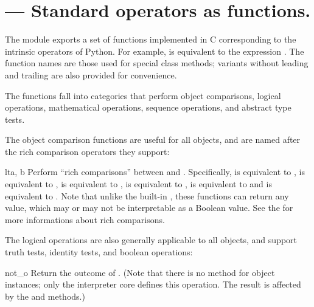 \section{ ---
         Standard operators as functions.}



The  module exports a set of functions implemented in C
corresponding to the intrinsic operators of Python.  For example,
 is equivalent to the expression .  The
function names are those used for special class methods; variants without
leading and trailing \samp{__} are also provided for convenience.

The functions fall into categories that perform object comparisons,
logical operations, mathematical operations, sequence operations, and
abstract type tests.

The object comparison functions are useful for all objects, and are
named after the rich comparison operators they support:

\begin{funcdesc}{lt}{a, b}
Perform ``rich comparisons'' between  and . Specifically,
 is equivalent to ,
 is equivalent to ,
 is equivalent to ,
 is equivalent to ,
 is equivalent to 
and
 is equivalent to .
Note that unlike the built-in , these functions can
return any value, which may or may not be interpretable as a Boolean
value.  See the 
for more informations about rich comparisons.
\end{funcdesc}


The logical operations are also generally applicable to all objects,
and support truth tests, identity tests, and boolean operations:

\begin{funcdesc}{not_}{o}
Return the outcome of  .  (Note that there is no
 method for object instances; only the interpreter
core defines this operation.  The result is affected by the
 and  methods.)
\end{funcdesc}

